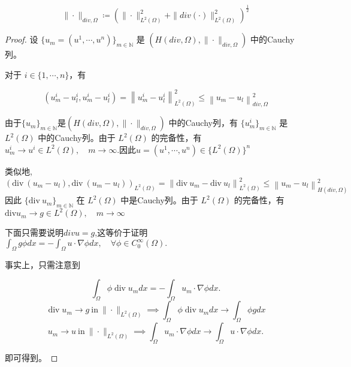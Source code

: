 \documentclass[12pt,a4paper]{article}
\begin{document}
\begin{enumerate}
		$$\|\cdot\|_{div,\Omega} \coloneqq (\|\cdot\|_{L^2(\Omega)}^2 + \|div(\cdot)\|_{L^2(\Omega)}^2)^{\frac{1}{2}}$$
		
		\begin{proof}
			设 $\{u_m=(u^1,\cdots,u^n)\}_{m\in\mathbb{N}}$ 是 $(H(div,\Omega),\|\cdot\|_{div,\Omega})$ 中的Cauchy列。
			
			对于 $i\in\{1,\cdots,n\}$，有
			
			$$(u_m^i-u_l^i,u_m^i-u_l^i)=\left\|u_m^i-u_l^i\right\|_{L^2(\Omega)}^2\leq\left\|u_m-u_l\right\|_{div,\Omega}^2$$
			
			由于$\{u_m\}_{m\in\mathbb{N}}$是$(H(div,\Omega),\|\cdot\|_{div,\Omega})$ 中的Cauchy列，有 $\{u_m^i\}_{m\in\mathbb{N}}$ 是 $L^2(\Omega)$ 中的Cauchy列。由于 $L^2(\Omega)$ 的完备性，有 $u_m^i\to u^i\in L^2(\Omega), \quad m\to\infty$.因此$u=(u^1,\cdots,u^n)\in\{L^2(\Omega)\}^n$
			
			类似地,
			$$
			(\mathrm{div}\:(u_m-u_l),\mathrm{div}\:(u_m-u_l))_{L^2(\Omega)}=\left\|\mathrm{div}\:u_m-\mathrm{div}\:u_l\right\|_{L^2(\Omega)}^2\leq\left\|u_m-u_l\right\|_{H(div,\Omega)}^2
			$$
			因此 $\{\mathrm{div} \:u_m\}_{m\in\mathbb{N}}$ 在 $L^2(\Omega)$ 中是Cauchy列。由于 $L^2(\Omega)$ 的完备性，有$\mathrm{div} u_m\to g\in L^2(\Omega), \quad m\to\infty$
			
			下面只需要说明$div u = g$,这等价于证明$\int_\Omega g\phi dx=-\int_\Omega u\cdot\nabla\phi dx,\quad \forall \phi\in C_0^\infty(\Omega).$
			
			事实上，只需注意到
			
			$$\int_{\Omega}\phi\operatorname{div}u_{m} dx=-\int_{\Omega}u_{m}\cdot\nabla\phi dx.$$
			$$\operatorname{div}u_{m}\to g\mathrm{~in~}\|\cdot\|_{L^{2}(\Omega)}\implies\int_{\Omega}\phi\operatorname{div}u_{m} dx\to\int_{\Omega}\phi g dx$$
			$$u_{m}\to u\mathrm{~in~}\|\cdot\|_{L^{2}(\Omega)}\implies\int_{\Omega}u_{m}\cdot\nabla\phi dx\to\int_{\Omega}u\cdot\nabla\phi dx.$$
			
			即可得到。
		\end{proof}
		
		
	\end{enumerate}
	
	
\end{document}
